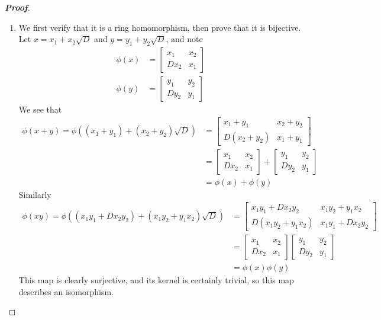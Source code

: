 \documentclass[12pt,leqno]{book}
\theoremstyle{definition}
\newenvironment{Proof}{\begin{proof}[\textnormal{\textbf{Proof}}]}{\end{proof}}
\begin{document}
\begin{enumerate}
\begin{Proof}
\begin{enumerate}
  \item We first verify that it is a ring homomorphism, then prove that it is bijective. Let $x=x_1+x_2\sqrt{D}$ and $y=y_1+y_2\sqrt{D}$, and note \begin{align*}\phi(x)&=\begin{bmatrix}x_1&x_2\\Dx_2&x_1\end{bmatrix}\\\phi(y)&=\begin{bmatrix}y_1&y_2\\Dy_2&y_1\end{bmatrix}\end{align*} We see that \begin{align*}\phi(x+y)=\phi\left((x_1+y_1)+(x_2+y_2)\sqrt{D}\right)&=\begin{bmatrix}x_1+y_1&x_2+y_2\\D(x_2+y_2)&x_1+y_1\end{bmatrix}\\&=\begin{bmatrix}x_1&x_2\\Dx_2&x_1\end{bmatrix}+\begin{bmatrix}y_1&y_2\\Dy_2&y_1\end{bmatrix}\\&=\phi(x)+\phi(y)\end{align*} Similarly \begin{align*}\phi(xy)=\phi\left((x_1y_1+Dx_2y_2)+(x_1y_2+y_1x_2)\sqrt{D}\right)&=\begin{bmatrix}x_1y_1+Dx_2y_2&x_1y_2+y_1x_2\\D(x_1y_2+y_1x_2)&x_1y_1+Dx_2y_2\end{bmatrix}\\&=\begin{bmatrix}x_1&x_2\\Dx_2&x_1\end{bmatrix}\begin{bmatrix}y_1&y_2\\Dy_2&y_1\end{bmatrix}\\&=\phi(x)\phi(y)\end{align*} This map is clearly surjective, and its kernel is certainly trivial, so this map describes an isomorphism.

\end{enumerate}
\end{Proof}
\end{enumerate}
\end{document}
